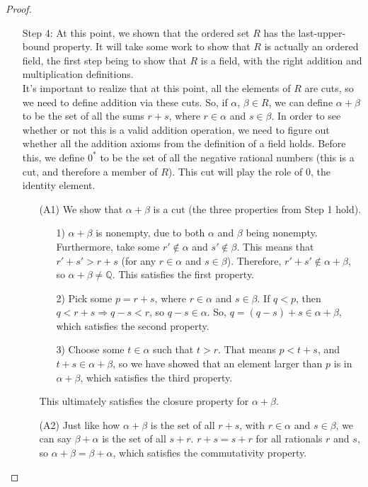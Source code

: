 \documentclass{article}
\theoremstyle{definition}
\begin{document}
\begin{section}
\begin{proof}
\begin{enumerate}
\item[Step 4:] At this point, we shown that the ordered set $R$ has the last-upper-bound property. It will take some work to show that $R$ is actually an ordered field, the first step being to show that $R$ is a field, with the right addition and multiplication definitions. \\
It's important to realize that at this point, all the elements of $R$ are cuts, so we need to define addition via these cuts. So, if $\alpha$, $\beta \in R$, we can define $\alpha + \beta$ to be the set of all the sums $r+s$, where $r \in \alpha$ and $s \in \beta$. In order to see whether or not this is a valid addition operation, we need to figure out whether all the addition axioms from the definition of a field holds. Before this, we define $0^*$ to be the set of all the negative rational numbers (this is a cut, and therefore a member of $R$). This cut will play the role of $0$, the identity element. 
\begin{enumerate}
\item[(A1)] We show that $\alpha + \beta$ is a cut (the three properties from Step 1 hold). 
\begin{enumerate}
\item[1)] $\alpha + \beta$ is nonempty, due to both $\alpha$ and $\beta$ being nonempty. Furthermore, take some $r' \not\in\alpha$ and $s'\not\in\beta$. This means that $r' + s' > r + s$ (for any $r \in \alpha$ and $s \in \beta$). Therefore, $r' + s' \not\in \alpha + \beta$, so $\alpha + \beta \neq \mathbb{Q}$. This satisfies the first property. \checkmark \\
\item[2)] Pick some $p = r + s$, where $r \in \alpha$ and $s \in \beta$. If $q < p$, then $q < r + s \Rightarrow q - s < r$, so $q-s \in \alpha$. So, $q = (q-s) + s \in \alpha + \beta$, which satisfies the second property. \checkmark \\
\item[3)] Choose some $t \in \alpha$ such that $t > r$. That means $p < t + s$, and $t+s \in \alpha + \beta$, so we have showed that an element larger than $p$ is in $\alpha + \beta$, which satisfies the third property. \checkmark 
\end{enumerate}
This ultimately satisfies the closure property for $\alpha + \beta$.
\item[(A2)] Just like how $\alpha + \beta$ is the set of all $r+s$, with $r \in\alpha$ and $s\in\beta$, we can say $\beta + \alpha$ is the set of all $s+r$. $r+s=s+r$ for all rationals $r$ and $s$, so $\alpha + \beta = \beta + \alpha$, which satisfies the commutativity property.

\end{enumerate}
\end{enumerate}
\end{proof}
\end{section}
\end{document}
